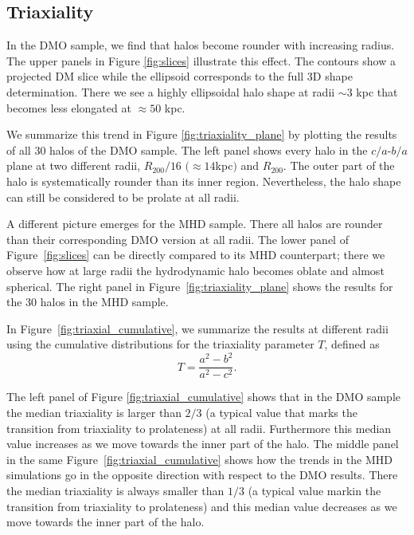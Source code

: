 \documentclass[usenatbib]{mnras}
\begin{document}
\subsection{Triaxiality}


In the DMO sample, we find that halos become rounder with increasing radius.
The upper panels in Figure \ref{fig:slices} illustrate this effect.
The contours show a projected DM slice while the ellipsoid corresponds
to the full 3D shape determination. There we see a highly ellipsoidal halo shape at radii $\sim 3$ kpc
that becomes less elongated at $\approx 50$ kpc.

We summarize this trend in Figure \ref{fig:triaxiality_plane} by
plotting the results of all 30 halos of the DMO sample.
The left panel shows every halo in the $c/a$-$b/a$ plane at
two different radii, $R_{200}/16$ $(\approx 14$kpc$)$ and $R_{200}$. 
The outer part of the halo is systematically rounder than its inner
region. Nevertheless, the halo shape can still be considered to be prolate at
all radii. 

A different picture emerges for the MHD sample.
There all halos are rounder than their corresponding DMO
version at all radii. The lower panel of Figure~\ref{fig:slices} can be directly compared to
its MHD counterpart; there we observe how at large radii the hydrodynamic halo
becomes oblate and almost spherical. The right panel in Figure~\ref{fig:triaxiality_plane} shows the
results for the 30 halos in the MHD sample.

In Figure~\ref{fig:triaxial_cumulative}, we summarize the results at
different radii using the cumulative distributions for the 
triaxiality parameter $T$, defined as 
\begin{equation}
T=\frac{a^2-b^2}{a^2-c^2}.
\label{eq:triaxiality}
\end{equation}

The left panel of Figure \ref{fig:triaxial_cumulative} shows that in
the DMO sample the median triaxiality is larger than $2/3$ (a
typical value that marks the transition from triaxiality to
prolateness) at all radii. Furthermore this median value increases 
as we move towards the inner part of the halo.
The middle panel in the same Figure~\ref{fig:triaxial_cumulative}
shows how the trends in the MHD simulations go 
in the opposite direction with respect to the DMO results.
There the median triaxiality is always smaller than $1/3$ (a typical
value markin the transition from triaxiality to prolateness) and this
median value decreases as we move towards the inner part of the halo.
\end{document}
